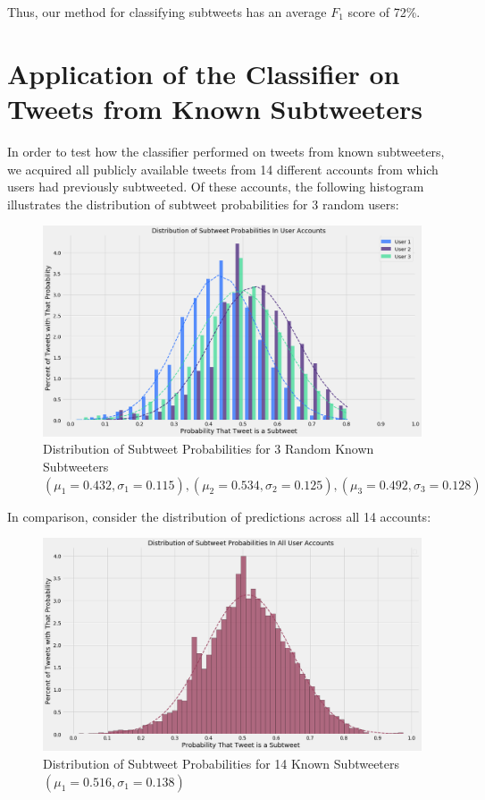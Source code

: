 \documentclass[11pt, twoside, reqno]{book}
\begin{document}
\noindent
Thus, our method for classifying subtweets has an average $F_{1}$ score of 72\%.

\section{Application of the Classifier on Tweets from Known Subtweeters}
\label{known_subtweeters_analysis}

In order to test how the classifier performed on tweets from known subtweeters, we acquired all publicly available tweets from 14 different accounts from which users had previously subtweeted. Of these accounts, the following histogram illustrates the distribution of subtweet probabilities for 3 random users:

\begin{figure}[H]
	\centering
	\includegraphics[width=\textwidth]{random_known_subtweeters}
	\caption{Distribution of Subtweet Probabilities for 3 Random Known Subtweeters 
	\\ 
	$(\mu_{1}=0.432, \sigma_{1}=0.115), (\mu_{2}=0.534, \sigma_{2}=0.125), (\mu_{3}=0.492, \sigma_{3}=0.128)$}
	\label{fig:random_subtweeters}
\end{figure}

\noindent
In comparison, consider the distribution of predictions across all 14 accounts:

\begin{figure}[H]
	\centering
	\includegraphics[width=\textwidth]{known_subtweeters}
	\caption{Distribution of Subtweet Probabilities for 14 Known Subtweeters $(\mu_{1}=0.516, \sigma_{1}=0.138)$}
	\label{fig:known_subtweeters}
\end{figure}
\end{document}
